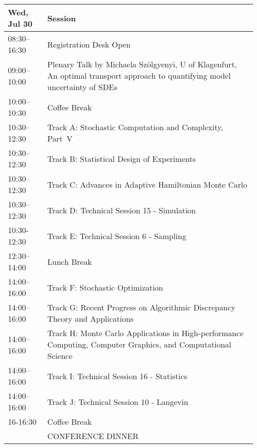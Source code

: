 \begin{table}
\vspace{-8ex}
\begin{tabularx}{\textwidth}{>{\hsize=0.32\hsize}X|>{\hsize=1.7\hsize}X}
\hline
\textbf{Wed, Jul 30} & \textbf{Session} \\
\hline
\cellcolor{\EmptyColor}08:30–16:30 & \cellcolor{\EmptyColor}Registration Desk Open \\
\cellcolor{\PlenaryColor}09:00–10:00 & \cellcolor{\PlenaryColor}Plenary Talk by Michaela Szölgyenyi, U of Klagenfurt, An optimal transport approach to quantifying model uncertainty of SDEs \\
\cellcolor{\EmptyColor}10:00–10:30 & \cellcolor{\EmptyColor}Coffee Break \\
\cellcolor{\SessionTitleColor}10:30–12:30 & \cellcolor{\SessionTitleColor}Track A: Stochastic Computation and Complexity, Part~V \\
\cellcolor{\SessionTitleColor}10:30–12:30 & \cellcolor{\SessionTitleColor}Track B: Statistical Design of Experiments \\
\cellcolor{\SessionTitleColor}10:30–12:30 & \cellcolor{\SessionTitleColor}Track C: Advances in Adaptive Hamiltonian Monte Carlo \\
\cellcolor{\SessionLightColor}10:30–12:30 & \cellcolor{\SessionLightColor}Track D: Technical Session 15 - Simulation \\
\cellcolor{\SessionLightColor}10:30-12:30 & \cellcolor{\SessionLightColor}Track E: Technical Session 6 - Sampling \\
\cellcolor{\EmptyColor}12:30–14:00 & \cellcolor{\EmptyColor}Lunch Break \\
\cellcolor{\SessionTitleColor}14:00–16:00 & \cellcolor{\SessionTitleColor}Track F: Stochastic Optimization \\
\cellcolor{\SessionTitleColor}14:00–16:00 & \cellcolor{\SessionTitleColor}Track G: Recent Progress on Algorithmic Discrepancy Theory and Applications \\
\cellcolor{\SessionTitleColor}14:00–16:00 & \cellcolor{\SessionTitleColor}Track H: Monte Carlo Applications in High-performance Computing, Computer Graphics, and Computational Science \\
\cellcolor{\SessionLightColor}14:00–16:00 & \cellcolor{\SessionLightColor}Track I: Technical Session 16 - Statistics \\
\cellcolor{\SessionLightColor}14:00–16:00 & \cellcolor{\SessionLightColor}Track J: Technical Session 10 - Langevin \\
\cellcolor{\EmptyColor}16-16:30 & \cellcolor{\EmptyColor}Coffee Break \\
\cellcolor{\EmptyColor} & \cellcolor{\EmptyColor}CONFERENCE DINNER \\
\hline
\end{tabularx}
\end{table}

